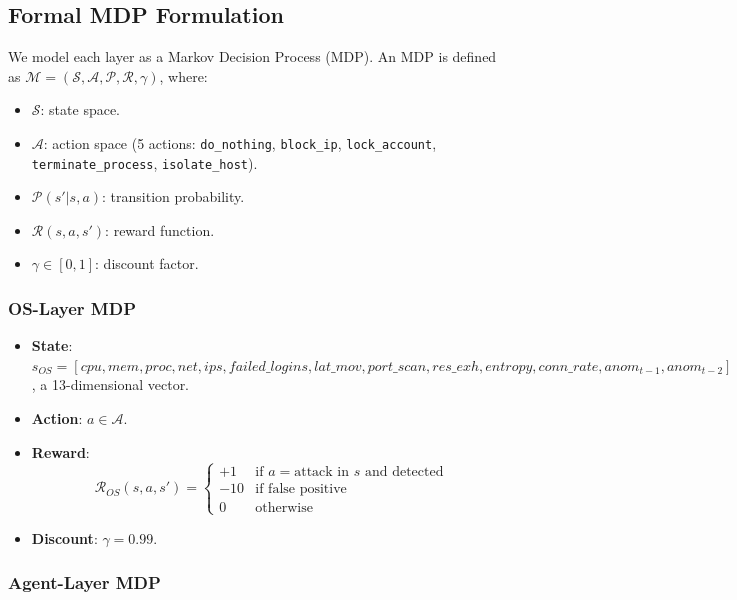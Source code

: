 \documentclass[conference]{IEEEtran}
\begin{document}
\subsection{Formal MDP Formulation}

We model each layer as a Markov Decision Process (MDP). An MDP is defined as $\mathcal{M} = (\mathcal{S}, \mathcal{A}, \mathcal{P}, \mathcal{R}, \gamma)$, where:
\begin{itemize}
\item $\mathcal{S}$: state space.
\item $\mathcal{A}$: action space (5 actions: \texttt{do\_nothing}, \texttt{block\_ip}, \texttt{lock\_account}, \texttt{terminate\_process}, \texttt{isolate\_host}).
\item $\mathcal{P}(s' | s, a)$: transition probability.
\item $\mathcal{R}(s, a, s')$: reward function.
\item $\gamma \in [0,1]$: discount factor.
\end{itemize}

\subsubsection{OS-Layer MDP}

\begin{itemize}
\item \textbf{State}: $s_{OS} = [cpu, mem, proc, net, ips, failed\_logins, lat\_mov, port\_scan, res\_exh, entropy, conn\_rate, anom_{t-1}, anom_{t-2}]$, a 13-dimensional vector.
\item \textbf{Action}: $a \in \mathcal{A}$.
\item \textbf{Reward}: 
  \begin{equation}
  \mathcal{R}_{OS}(s,a,s') = \begin{cases}
    +1 & \text{if } a = \text{attack in } s \text{ and detected} \\
    -10 & \text{if false positive} \\
    0 & \text{otherwise}
  \end{cases}
  \end{equation}
\item \textbf{Discount}: $\gamma = 0.99$.
\end{itemize}

\subsubsection{Agent-Layer MDP}
\end{document}
